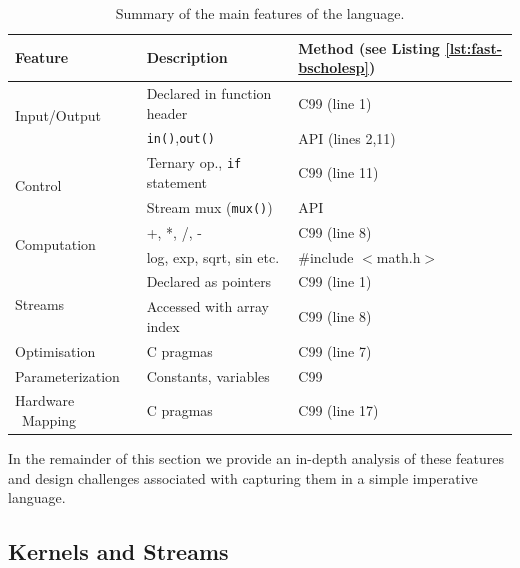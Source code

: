 \begin{table}[!h]
  \centering
  \renewcommand{\arraystretch}{1.5}
  \begin{tabularx}{\textwidth}{p{3.5cm}|X|X}
    \hline
    \bf{Feature}                   & \bf{Description}                   & \bf{Method (see Listing \ref{lst:fast-bscholesp})} \\
    \hline\hline
    \multirow{2}{*}{Input/Output}         & Declared in function header          & C99 (line 1)                                 \\\cline{2-3}       & \texttt{in()},\texttt{out()}  & \FAST{} API (lines 2,11) \\
    \hline
    \multirow{2}{*}{Control}     & Ternary op., \texttt{if} statement & C99 (line 11)                                \\\cline{2-3}      & Stream mux (\texttt{mux()})       & \FAST{} API  \\
    \hline
    \multirow{2}{*}{Computation} & +, *, /, -                         & C99 (line 8)                           \\\cline{2-3} & log, exp, sqrt, sin etc.  & \#include $<$math.h$>$  \\
    \hline
    \multirow{2}{*}{Streams}     & Declared as pointers               & C99 (line 1)                                 \\\cline{2-3}       & Accessed with array index & C99 (line 8) \\
    \hline
    Optimisation                 & C pragmas                   & C99 (line 7)                                 \\
    \hline
    Parameterization             & Constants, variables                   & C99                                          \\
    \hline
    Hardware \  Mapping                  & C pragmas                   & C99 (line 17)                                \\
  \end{tabularx}
  \caption{Summary of the main features of the \FAST{} language.}
  \label{table:maxc-features}
\end{table}

In the remainder of this section we provide an in-depth analysis of
these features and design challenges associated with capturing them in
a simple imperative language.

\subsection{Kernels and Streams}

